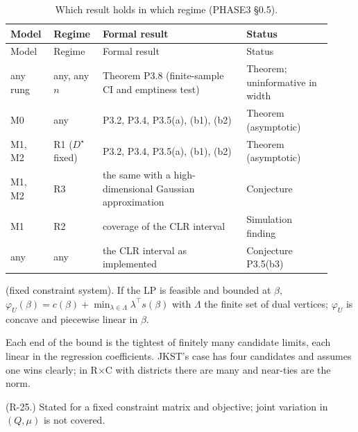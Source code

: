 \begin{longtable}{@{}L{0.12\linewidth}L{0.13\linewidth}L{0.42\linewidth}L{0.25\linewidth}@{}}
\caption{Which result holds in which regime (PHASE3 \S0.5).}\label{tab:regimes}\\
\toprule Model & Regime & Formal result & Status \\ \midrule\endfirsthead
\toprule Model & Regime & Formal result & Status \\ \midrule\endhead
any rung & any, any $n$ & Theorem P3.8 (finite-sample CI and emptiness test) & Theorem; uninformative in width \\
M0 & any & P3.2, P3.4, P3.5(a), (b1), (b2) & Theorem (asymptotic) \\
M1, M2 & R1 ($D^\star$ fixed) & P3.2, P3.4, P3.5(a), (b1), (b2) & Theorem (asymptotic) \\
M1, M2 & R3 & the same with a high-dimensional Gaussian approximation & Conjecture \\
M1 & R2 & coverage of the CLR interval & Simulation finding \\
any & any & the CLR interval as implemented & Conjecture P3.5(b3) \\
\bottomrule
\end{longtable}

\begin{result}\label{res:p31}
 (fixed constraint system). If the LP is feasible and bounded at
$\beta$, $\varphi_U(\beta)=c(\beta)+\min_{\lambda\in\Lambda}\lambda^\top s(\beta)$
with $\Lambda$ the finite set of dual vertices; $\varphi_U$ is concave and
piecewise linear in $\beta$.
\end{result}
\begin{plain}
Each end of the bound is the tightest of finitely many candidate limits, each
linear in the regression coefficients. JKST's case has four candidates and assumes
one wins clearly; in R$\times$C with districts there are many and near-ties are
the norm.
\end{plain}
\begin{revnote}(R-25.) Stated for a fixed constraint matrix and objective; joint variation in $(Q,\mu)$ is not covered.\end{revnote}

